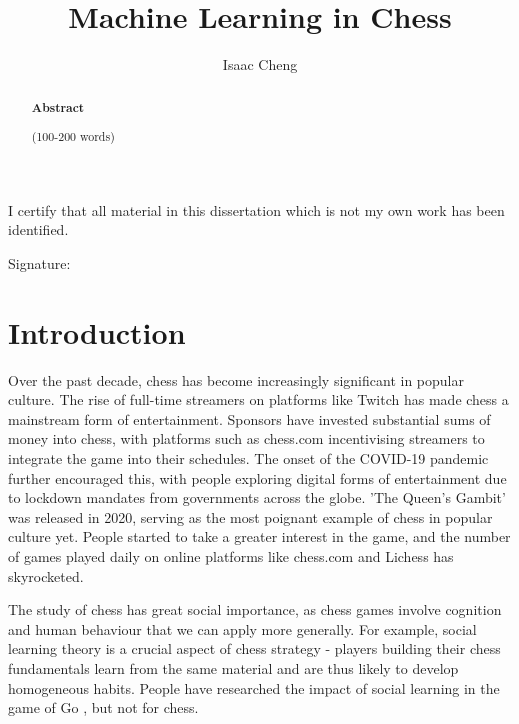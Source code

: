 \documentclass[%
 superscriptaddress,
showpacs,preprintnumbers,
 amsmath,
 amssymb,
 aps,
 pra,
showkeys,
onecolumn,
notitlepage,
11pt,
tightenlines      %
]{revtex4-1}
\begin{document}
\title{\Large Machine Learning in Chess}

\author{Isaac Cheng}

\begin{abstract}
\noindent \textbf{Abstract}

\noindent 
(100-200 words)

\end{abstract}

\maketitle

\vspace*{\fill}


\begin{center}
I certify that all material in this dissertation which is not my own work has been identified.
\end{center}
\vspace{1em}

Signature: \hrulefill


\newpage
\section{Introduction}
Over the past decade, chess has become increasingly significant in popular culture. The rise of full-time streamers on platforms like Twitch has made chess a mainstream form of entertainment. Sponsors have invested substantial sums of money into chess, with platforms such as chess.com incentivising streamers to integrate the game into their schedules. The onset of the COVID-19 pandemic further encouraged this, with people exploring digital forms of entertainment due to lockdown mandates from governments across the globe. 'The Queen's Gambit' was released in 2020, serving as the most poignant example of chess in popular culture yet. People started to take a greater interest in the game, and the number of games played daily on online platforms like chess.com and Lichess has skyrocketed. 

The study of chess has great social importance, as chess games involve cognition and human behaviour that we can apply more generally. For example, social learning theory is a crucial aspect of chess strategy - players building their chess fundamentals learn from the same material and are thus likely to develop homogeneous habits. People have researched the impact of social learning in the game of Go \cite{beheim2014strategic}, but not for chess.
\end{document}
